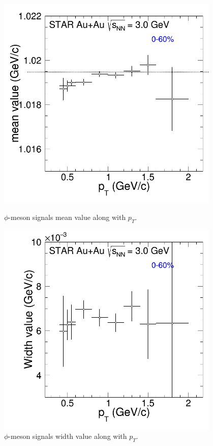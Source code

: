 \begin{figure}[htbp]
\begin{minipage}[htbp]{0.45\linewidth}
\centering
\includegraphics[width=0.95\textwidth]{chapterY/fig/fig1_mean_0.png}
\caption{$\phi$-meson signals mean value along with $p_T$. \label{fig:mixedEvent_mean}}
\end{minipage}
\hfill
\begin{minipage}[htbp]{0.45\linewidth}
\centering
\includegraphics[width=0.95\textwidth]{chapterY/fig/fig1_width_0.png} 
\caption{$\phi$-meson signals width value along with $p_T$. \label{fig:mixedEvent_width}}
\end{minipage}
\end{figure}

